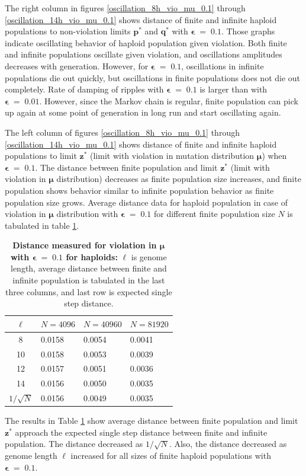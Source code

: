 \clearpage

The right column in figures \ref{oscillation_8h_vio_mu_0.1} through \ref{oscillation_14h_vio_mu_0.1} 
shows distance of finite and infinite haploid populations to non-violation limits $\bm{p^\ast}$ and $\bm{q^\ast}$ with $\bm{\epsilon} \;=\; 0.1$. 
Those graphs indicate oscillating behavior of haploid population given violation. 
Both finite and infinite populations oscillate given violation, and oscillations amplitudes decreases with generation. 
However, for $\bm{\epsilon} \;=\; 0.1$, oscillations in infinite populations die out quickly, 
but oscillations in finite populations does not die out completely. Rate of damping of ripples with $\bm{\epsilon} \;=\; 0.1$ is  
larger than with $\bm{\epsilon} \;=\; 0.01$. However, since the Markov chain is regular, 
finite population can pick up again at some point of generation in long run and start oscillating again.

The left column of figures \ref{oscillation_8h_vio_mu_0.1} through \ref{oscillation_14h_vio_mu_0.1} 
shows distance of finite and infinite haploid populations to limit $\bm{z^\ast}$ 
(limit with violation in mutation distribution $\bm{\mu}$) when $\bm{\epsilon} \;=\; 0.1$. 
The distance between finite population and limit $\bm{z}^\ast$ (limit with violation in $\bm{\mu}$ distribution) 
decreases as finite population size increases, 
and finite population shows behavior similar to infinite population behavior as finite population size grows. 
Average distance data for haploid population in case of violation in $\bm{\mu}$ distribution 
with $\bm{\epsilon} \;=\; 0.1$ for different finite population size $N$ is tabulated in table \ref{distanceMuHapEps0.1}.

\begin{table}[ht]
\caption[\textbf{Distance measured for violation in $\bm{\mu}$ with $\bm{\epsilon} \;=\; 0.1$ for haploids}]{\textbf{Distance measured for violation in $\bm{\mu}$ with $\bm{\epsilon} \;=\; 0.1$ for haploids:} $\ell$ is genome length, 
average distance between finite and infinite population is tabulated in the last three columns, and last row is expected single step distance.}
\centering
\begin{tabularx}{0.75\textwidth}{ c *{3}{X}}
\toprule
$\ell$ & $N = 4096$ & $N = 40960$ & $N = 81920$ \\
\midrule
8 & 0.0158	& 0.0054 	& 0.0041 \\
10 & 0.0158	& 0.0053 	& 0.0039 \\	
12 & 0.0157	& 0.0051 	& 0.0036 \\	
14 & 0.0156	& 0.0050 	& 0.0035 \\
\midrule
$1/\sqrt{N}$ & 0.0156 & 0.0049 & 0.0035 \\
\bottomrule
\end{tabularx}
\label{distanceMuHapEps0.1}
\end{table}

The results in Table \ref{distanceMuHapEps0.1} show average distance 
between finite population and limit $\bm{z^\ast}$ approach the expected single step distance 
between finite and infinite population. The distance decreased as $1/\sqrt{N}$. 
Also, the distance decreased as genome length $\ell$ increased for all sizes of finite haploid populations 
with $\bm{\epsilon} \;=\; 0.1$.
